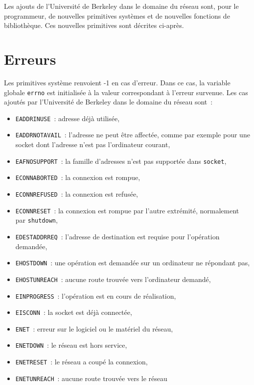 \documentclass [twoside] {report}
\begin{document}
Les ajouts de l'Université de Berkeley dans le domaine du
réseau sont, pour le programmeur, de nouvelles primitives
systèmes et de nouvelles fonctions de bibliothèque. Ces nouvelles
primitives sont décrites ci-après.

\section* {Erreurs}

Les primitives système renvoient -1 en cas d'erreur. Dans ce
cas, la variable globale \texttt {errno} est initialisée à la
valeur correspondant à l'erreur survenue. Les cas ajoutés
par l'Université de Berkeley dans le domaine du réseau sont~:

\begin {itemize}
    \item \texttt {EADDRINUSE}~: adresse déjà utilisée,
    \item \texttt {EADDRNOTAVAIL}~: l'adresse ne peut être affectée, comme
	par exemple pour une socket dont l'adresse n'est
	pas l'ordinateur courant,
    \item \texttt {EAFNOSUPPORT}~: la famille d'adresses n'est pas supportée
	dans \texttt {socket},
    \item \texttt {ECONNABORTED}~: la connexion est rompue,
    \item \texttt {ECONNREFUSED}~: la connexion est refusée,
    \item \texttt {ECONNRESET}~: la connexion est rompue par l'autre
	extrémité, normalement par \texttt {shutdown},
    \item \texttt {EDESTADDRREQ}~: l'adresse de destination est requise pour
	l'opération demandée,
    \item \texttt {EHOSTDOWN}~: une opération est demandée sur un ordinateur
	ne répondant pas,
    \item \texttt {EHOSTUNREACH}~: aucune route trouvée vers l'ordinateur
	demandé,
    \item \texttt {EINPROGRESS}~: l'opération est en cours de réalisation,
    \item \texttt {EISCONN}~: la socket est déjà connectée,
    \item \texttt {ENET}~: erreur sur le logiciel ou le matériel du réseau,
    \item \texttt {ENETDOWN}~: le réseau est hors service,
    \item \texttt {ENETRESET}~: le réseau a coupé la connexion,
    \item \texttt {ENETUNREACH}~: aucune route trouvée vers le réseau

\end{itemize}
\end{document}
